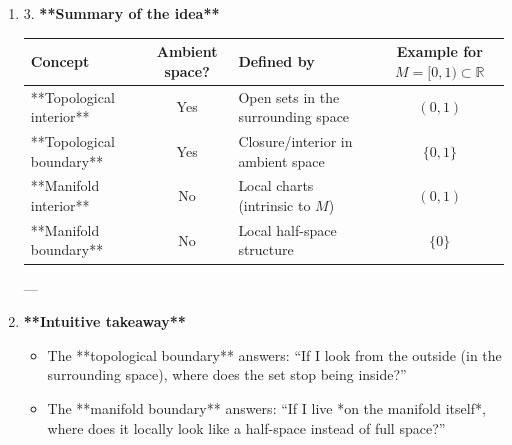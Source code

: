\documentclass[10pt,a4paper]{report}
\begin{document}
\begin{enumerate}
\begin{itemize}
\item  Example (again, $M = [0,1)\subset\mathbb{R})$:

\item  As a manifold with boundary, $M$ is locally modeled on:

\begin{itemize}

  \item $(0,1) \equiv$ open subset of $\mathbb{R}$,
  \item $\{0\} \equiv$ boundary point (looks like $x_n=0$ in $\mathbb{H}^1 = [0,\infty))$.

\end{itemize}
So:
$$
\operatorname{Int}*{\text{manifold}}(M) = (0,1), \quad
\partial*{\text{manifold}}(M) = {0}.
$$

This conclusion doesn’t depend on whether $M$ sits inside $\mathbb{R}$, inside a circle, or even inside some abstract topological space.

\end{itemize}
---

\item  3. \textbf{**Summary of the idea**}

\begin{tabular}{|lclc|}
\hline
Concept  & Ambient space? & Defined by & Example for $M=[0,1)\subset\mathbb{R}$ \\
\hline **Topological interior** &  Yes & Open sets in the surrounding space & $(0,1)$ \\
\hline **Topological boundary** & Yes & Closure/interior in ambient space  & $\{0,1\}$                           \\
\hline **Manifold interior** &  No & Local charts (intrinsic to $M$)    & $(0,1)$   \\
\hline**Manifold boundary** &  No   & Local half-space structure & $\{0\}$                   \\
\hline
\end{tabular}
---

\item  \textbf{**Intuitive takeaway**}

\begin{itemize}

\item The **topological boundary** answers:
  “If I look from the outside (in the surrounding space), where does the set stop being inside?”

\item The **manifold boundary** answers:
  “If I live *on the manifold itself*, where does it locally look like a half-space instead of full space?”
\end{itemize}


\end{enumerate}
\end{document}
